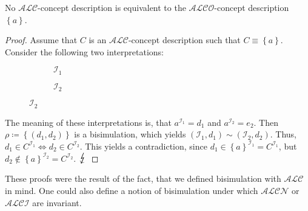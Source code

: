 \begin{prop}
	No $\mathcal{ALC}$-concept description is equivalent to the $\mathcal{ALCO}$-concept description $\left\{ a \right\}$.
\end{prop}
\begin{proof}
	Assume that $C$ is an $\mathcal{ALC}$-concept description such that $C \equiv \left\{ a \right\}$.
	Consider the following two interpretations:
	\begin{figure}[H]
		\centering
		\begin{subfigure}[t]{.475\textwidth}
			\centering
			\caption{$\mathcal{I}_1$}
		\end{subfigure}
		\hfill
		\begin{subfigure}[t]{.475\textwidth}
			\centering
			\caption{$\mathcal{I}_2$}
	\end{subfigure}
	\end{figure}
	The meaning of these interpretations is, that $a^{\mathcal{I}_1} = d_1$ and $a^{\mathcal{I}_2} = e_2$.
	Then $\rho \coloneqq \left\{ (d_1,d_2) \right\}$ is a bisimulation, which yields $\left( \mathcal{I}_1, d_1 \right) \sim \left( \mathcal{I}_2, d_2 \right)$.
	Thus, $d_1 \in C^{\mathcal{I}_1} \iff d_2 \in C^{\mathcal{I}_2}$.
	This yields a contradiction, since $d_1 \in \left\{ a \right\}^{\mathcal{I}_1} = C^{\mathcal{I}_1}$, but
	 $d_2 \notin \left\{ a \right\}^{\mathcal{I}_2} = C^{\mathcal{I}_2}$. $\contra$
\end{proof}
These proofs were the result of the fact, that we defined bisimulation with $\mathcal{ALC}$ in mind.
One could also define a notion of bisimulation under which $\mathcal{ALCN}$ or $\mathcal{ALCI}$ are invariant.

